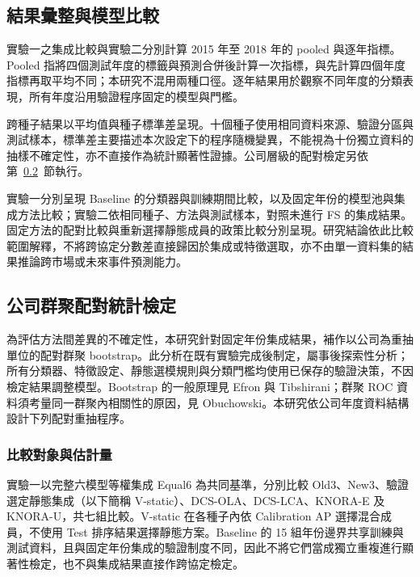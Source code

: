 \subsection{結果彙整與模型比較}

實驗一之集成比較與實驗二分別計算 2015 年至 2018 年的 pooled 與逐年指標。Pooled 指將四個測試年度的標籤與預測合併後計算一次指標，與先計算四個年度指標再取平均不同；本研究不混用兩種口徑。逐年結果用於觀察不同年度的分類表現，所有年度沿用驗證程序固定的模型與門檻。

跨種子結果以平均值與種子標準差呈現。十個種子使用相同資料來源、驗證分區與測試樣本，標準差主要描述本次設定下的程序隨機變異，不能視為十份獨立資料的抽樣不確定性，亦不直接作為統計顯著性證據。公司層級的配對檢定另依第~\ref{sec:method-statistics}~節執行。

實驗一分別呈現 Baseline 的分類器與訓練期間比較，以及固定年份的模型池與集成方法比較；實驗二依相同種子、方法與測試樣本，對照未進行 FS 的集成結果。固定方法的配對比較與重新選擇靜態成員的政策比較分別呈現。研究結論依此比較範圍解釋，不將跨協定分數差直接歸因於集成或特徵選取，亦不由單一資料集的結果推論跨市場或未來事件預測能力。

\subsection{公司群聚配對統計檢定}\label{sec:method-statistics}

為評估方法間差異的不確定性，本研究針對固定年份集成結果，補作以公司為重抽單位的配對群聚 bootstrap。此分析在既有實驗完成後制定，屬事後探索性分析；所有分類器、特徵設定、靜態選模規則與分類門檻均使用已保存的驗證決策，不因檢定結果調整模型。Bootstrap 的一般原理見 Efron 與 Tibshirani\autocite{efron1986bootstrap}；群聚 ROC 資料須考量同一群聚內相關性的原因，見 Obuchowski\autocite{obuchowski1997clustered}。本研究依公司年度資料結構設計下列配對重抽程序。

\subsubsection{比較對象與估計量}

實驗一以完整六模型等權集成 Equal6 為共同基準，分別比較 Old3、New3、驗證選定靜態集成（以下簡稱 V-static）、DCS-OLA、DCS-LCA、KNORA-E 及 KNORA-U，共七組比較。V-static 在各種子內依 Calibration AP 選擇混合成員，不使用 Test 排序結果選擇靜態方案。Baseline 的 15 組年份邊界共享訓練與測試資料，且與固定年份集成的驗證制度不同，因此不將它們當成獨立重複進行顯著性檢定，也不與集成結果直接作跨協定檢定。

